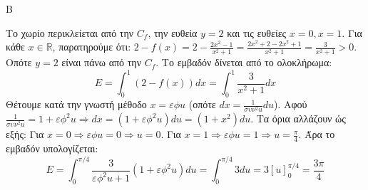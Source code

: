 \begin{thema}{Β}
\begin{erwthma}
\item Το χωρίο περικλείεται από την $C_f$, την ευθεία $y=2$ και τις ευθείες $x=0, x=1$.
Για κάθε $x \in \mathbb{R}$, παρατηρούμε ότι: 
$2 - f(x) = 2 - \frac{2x^2-1}{x^2+1} = \frac{2x^2+2-2x^2+1}{x^2+1} = \frac{3}{x^2+1} > 0$.
Οπότε $y = 2$ είναι πάνω από την $C_f$. Το εμβαδόν δίνεται από το ολοκλήρωμα:
\[ E = \int_0^1 (2 - f(x)) dx = \int_0^1 \frac{3}{x^2+1} dx \]
Θέτουμε κατά την γνωστή μέθοδο $x = \varepsilon\phi u$ (οπότε $dx = \frac{1}{\sigma\upsilon\nu^2 u} du$).
Αφού $\frac{1}{\sigma\upsilon\nu^2 u} = 1+\varepsilon\phi^2 u \Rightarrow dx = (1+\varepsilon\phi^2 u) du = (1+x^2)du$.
Τα όρια αλλάζουν ώς εξής: Για $x=0 \Rightarrow \varepsilon\phi u = 0 \Rightarrow u=0$. Για $x=1 \Rightarrow \varepsilon\phi u = 1 \Rightarrow u = \frac{\pi}{4}$.
Άρα το εμβαδόν υπολογίζεται:
\[ E = \int_0^{\pi/4} \frac{3}{\varepsilon\phi^2 u + 1}(1+\varepsilon\phi^2 u)du = \int_0^{\pi/4} 3 du = 3[u]_0^{\pi/4} = \frac{3\pi}{4} \]
\end{erwthma}
\end{thema}

